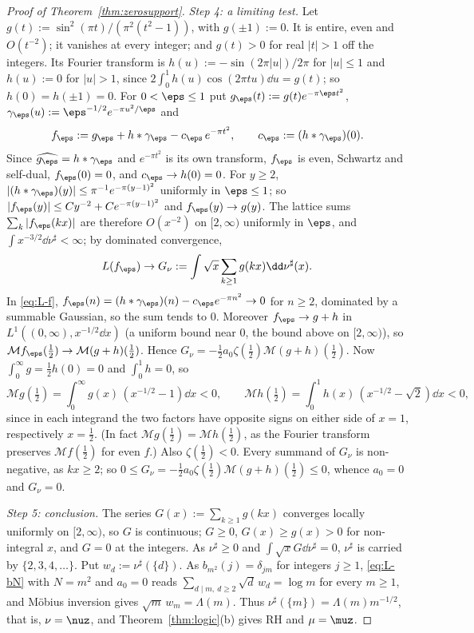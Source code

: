 \begin{proof}[Proof of Theorem~\textup{\ref{thm:zerosupport}}]
\emph{Step 4: a limiting test.} Let $g(t):=\sin^2(\pi t)/(\pi^2(t^2-1))$, with $g(\pm1):=0$. It is entire, even and $O(t^{-2})$; it vanishes
at every integer; and $g(t)>0$ for real $|t|>1$ off the integers. Its Fourier transform is $h(u):=-\sin(2\pi|u|)/2\pi$ for $|u|\le1$ and
$h(u):=0$ for $|u|>1$, since $2\int_0^1h(u)\cos(2\pi tu)\dd u=g(t)$; so $h(0)=h(\pm1)=0$. For $0<\eps\le1$ put $g_\eps(t):=g(t)e^{-\pi\eps t^2}$,
$\gamma_\eps(u):=\eps^{-1/2}e^{-\pi u^2/\eps}$ and
\[
f_\eps:=g_\eps+h*\gamma_\eps-c_\eps\,e^{-\pi t^2},\qquad c_\eps:=(h*\gamma_\eps)(0).
\]
Since $\widehat{g_\eps}=h*\gamma_\eps$ and $e^{-\pi t^2}$ is its own transform, $f_\eps$ is even, Schwartz and self-dual, $f_\eps(0)=0$, and
$c_\eps\to h(0)=0$. For $y\ge2$, $|(h*\gamma_\eps)(y)|\le\pi^{-1}e^{-\pi(y-1)^2}$ uniformly in $\eps\le1$; so
$|f_\eps(y)|\le Cy^{-2}+Ce^{-\pi(y-1)^2}$ and $f_\eps(y)\to g(y)$. The lattice sums $\sum_k|f_\eps(kx)|$ are therefore $O(x^{-2})$ on $[2,\infty)$
uniformly in $\eps$, and $\int x^{-3/2}\dd\nu^\sharp<\infty$; by dominated convergence,
\[
L(f_\eps)\to G_\nu:=\int\sqrt x\sum_{k\ge1}g(kx)\dd\nu^\sharp(x).
\]
In \eqref{eq:L-f}, $f_\eps(n)=(h*\gamma_\eps)(n)-c_\eps e^{-\pi n^2}\to0$ for $n\ge2$, dominated by a summable Gaussian, so the sum tends to $0$.
Moreover $f_\eps\to g+h$ in $L^1((0,\infty),x^{-1/2}\dd x)$ (a uniform bound near $0$, the bound above on $[2,\infty)$), so
$\mathcal Mf_\eps(\frac12)\to\mathcal M(g+h)(\frac12)$. Hence $G_\nu=-\frac12a_0\zeta(\frac12)\mathcal M(g+h)(\frac12)$. Now $\int_0^\infty g=\frac12h(0)=0$
and $\int_0^1h=0$, so
\[
\mathcal Mg(\tfrac12)=\int_0^\infty g(x)\,(x^{-1/2}-1)\dd x<0,\qquad \mathcal Mh(\tfrac12)=\int_0^1h(x)\,(x^{-1/2}-\sqrt2)\dd x<0,
\]
since in each integrand the two factors have opposite signs on either side of $x=1$, respectively $x=\frac12$. (In fact
$\mathcal Mg(\frac12)=\mathcal Mh(\frac12)$, as the Fourier transform preserves $\mathcal Mf(\frac12)$ for even $f$.) Also $\zeta(\frac12)<0$. Every
summand of $G_\nu$ is non-negative, as $kx\ge2$; so $0\le G_\nu=-\frac12a_0\zeta(\frac12)\mathcal M(g+h)(\frac12)\le0$, whence $a_0=0$ and
$G_\nu=0$.

\emph{Step 5: conclusion.} The series $G(x):=\sum_{k\ge1}g(kx)$ converges locally uniformly on $[2,\infty)$, so $G$ is continuous; $G\ge0$,
$G(x)\ge g(x)>0$ for non-integral $x$, and $G=0$ at the integers. As $\nu^\sharp\ge0$ and $\int\sqrt xG\dd\nu^\sharp=0$, $\nu^\sharp$ is carried
by $\{2,3,4,\dots\}$. Put $w_d:=\nu^\sharp(\{d\})$. As $b_{m^2}(j)=\delta_{jm}$ for integers $j\ge1$, \eqref{eq:L-bN} with $N=m^2$ and $a_0=0$
reads $\sum_{d\mid m,\ d\ge2}\sqrt d\,w_d=\log m$ for every $m\ge1$, and M\"obius inversion gives $\sqrt m\,w_m=\Lambda(m)$. Thus
$\nu^\sharp(\{m\})=\Lambda(m)m^{-1/2}$, that is, $\nu=\nuz$, and Theorem~\ref{thm:logic}(b) gives RH and $\mu=\muz$.
\end{proof}

